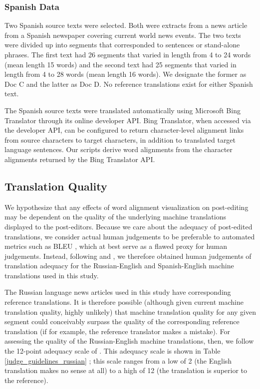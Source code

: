 \subsubsection{Spanish Data}

Two Spanish source texts were selected. Both were extracts from a news article from a Spanish newspaper covering current world news events. 
%
The two texts were divided up into segments that corresponded to sentences or stand-alone phrases. 
%
The first text had 26 segments that varied in length from 4 to 24 words (mean length 15 words) and the second text had 25 segments that varied in length from 4 to 28 words (mean length 16 words).
%
We designate the former as Doc C and the latter as Doc D.
%
No reference translations exist for either Spanish text.

The Spanish source texts were translated automatically using Microsoft Bing Translator through its online developer API.
%
Bing Translator, when accessed via the developer API, can be configured to return character-level alignment links from source characters to target characters, in addition to translated target language sentences.
%
Our scripts derive word alignments from the character alignments returned by the Bing Translator API.



\subsection{Translation Quality}
\label{sec:translation_quality}

We hypothesize that any effects of word alignment visualization on post-editing may be dependent on the quality of the underlying machine translations displayed to the post-editors.
%
Because we care about the adequacy of post-edited translations, we consider actual human judgements to be preferable to automated metrics such as BLEU \citep{2002_ACL_Papineni_etal}, which at best serve as a flawed proxy for human judgements.
%
Instead, following \citet{2009_EACL_Albrecht_etal} and \citet{2014_WMT_Schwartz_etal}, we therefore obtained human judgements of translation adequacy for the Russian-English and Spanish-English machine translations used in this study.

The Russian language news articles used in this study have corresponding reference translations.
%
It is therefore possible (although given current machine translation quality, highly unlikely) that machine translation quality for any given segment could conceivably surpass the quality of the corresponding reference translation (if for example, the reference translator makes a mistake).
%
For assessing the quality of the Russian-English machine translations, then, we follow the 12-point adequacy scale of \citet{2014_WMT_Schwartz_etal}.
%
This adequacy scale is shown in Table \ref{judge_guidelines_russian} ;
%
this scale ranges from a low of 2 (the English translation makes no sense at all) to a high of 12 (the translation is superior to the reference).

